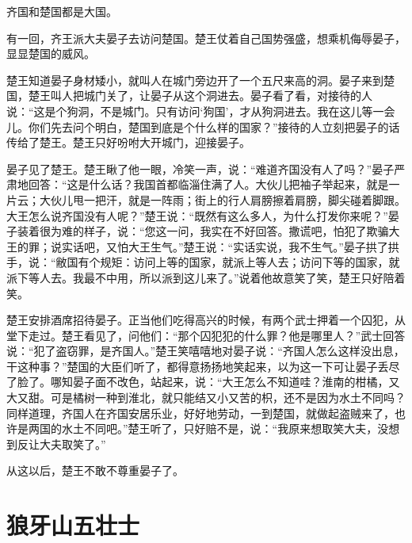 \documentclass[12pt,UTF-8,openany]{ctexbook}
\begin{document}
\begin{Large}
    
    齐国和楚国都是大国。
    
    有一回，齐王派大夫晏子去访问楚国。楚王仗着自己国势强盛，想乘机侮辱晏子，显显楚国的威风。
    
    楚王知道晏子身材矮小，就叫人在城门旁边开了一个五尺来高的洞。晏子来到楚国，楚王叫人把城门关了，让晏子从这个洞进去。晏子看了看，对接待的人说：“这是个狗洞，不是城门。只有访问‘狗国’，才从狗洞进去。我在这儿等一会儿。你们先去问个明白，楚国到底是个什么样的国家？”接待的人立刻把晏子的话传给了楚王。楚王只好吩咐大开城门，迎接晏子。
    
    晏子见了楚王。楚王瞅了他一眼，冷笑一声，说：“难道齐国没有人了吗？”晏子严肃地回答：“这是什么话？我国首都临淄住满了人。大伙儿把袖子举起来，就是一片云；大伙儿甩一把汗，就是一阵雨；街上的行人肩膀擦着肩膀，脚尖碰着脚跟。大王怎么说齐国没有人呢？”楚王说：“既然有这么多人，为什么打发你来呢？”晏子装着很为难的样子，说：“您这一问，我实在不好回答。撒谎吧，怕犯了欺骗大王的罪；说实话吧，又怕大王生气。”楚王说：“实话实说，我不生气。”晏子拱了拱手，说：“敝国有个规矩：访问上等的国家，就派上等人去；访问下等的国家，就派下等人去。我最不中用，所以派到这儿来了。”说着他故意笑了笑，楚王只好陪着笑。
    
    楚王安排酒席招待晏子。正当他们吃得高兴的时候，有两个武士押着一个囚犯，从堂下走过。楚王看见了，问他们：“那个囚犯犯的什么罪？他是哪里人？”武士回答说：“犯了盗窃罪，是齐国人。”楚王笑嘻嘻地对晏子说：“齐国人怎么这样没出息，干这种事？”楚国的大臣们听了，都得意扬扬地笑起来，以为这一下可让晏子丢尽了脸了。哪知晏子面不改色，站起来，说：“大王怎么不知道哇？淮南的柑橘，又大又甜。可是橘树一种到淮北，就只能结又小又苦的枳，还不是因为水土不同吗？同样道理，齐国人在齐国安居乐业，好好地劳动，一到楚国，就做起盗贼来了，也许是两国的水土不同吧。”楚王听了，只好赔不是，说：“我原来想取笑大夫，没想到反让大夫取笑了。”
    
    从这以后，楚王不敢不尊重晏子了。
    
\end{Large}

\chapter{狼牙山五壮士}
\end{document}
